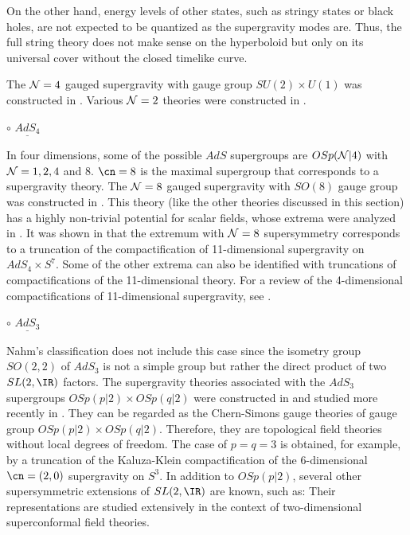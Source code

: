On the other hand, energy levels of other states, such as stringy
states or black holes, are not expected to be quantized as 
the supergravity modes are. Thus, the full string theory does not make
sense on the hyperboloid but only on its universal cover
without the closed timelike curve.

The ${\cal N}=4$ gauged supergravity with gauge group $SU(2) \times
U(1)$ was constructed in
\cite{Romans:1986ps}. Various ${\cal N}=2$ theories were
constructed in \cite{D'Auria:1982yi,Gunaydin:1984bi,Gunaydin:1984nt,
Gunaydin:1985ak}. 


\medskip
\noindent
$\circ$ $\underline{AdS_4}$

In four dimensions, some of the possible $AdS$ supergroups are
$OSp({\cal N}|4)$ with ${\cal N}=1,2,4$ and $8$. $\cn=8$ is the
maximal supergroup that corresponds to a supergravity theory.
The ${\cal N}=8$ gauged supergravity with $SO(8)$
gauge group was constructed in \cite{deWit:1982eq,
deWit:1982ig}. This theory (like the other theories discussed in
this section) has a highly
non-trivial potential for scalar fields, whose extrema
were analyzed in \cite{Warner:1983vz,Warner:1984du}. It was
shown in \cite{deWit:1985iy}  that the extremum with
${\cal N}=8$ supersymmetry corresponds to a truncation of the
compactification of  11-dimensional supergravity
on $AdS_4\times S^7$. Some of the other extrema can also be
identified with truncations of
compactifications of the 11-dimensional theory. 
For a review of the 4-dimensional compactifications
of 11-dimensional supergravity, see
\cite{Duff:1986hr}. 


\medskip
\noindent
$\circ$ $\underline{AdS_3}$

Nahm's classification does not include this case since
the isometry group $SO(2,2)$ of $AdS_3$ is not a simple group
but rather the direct product of two $SL(2,\IR)$ factors.
The supergravity theories associated with  the $AdS_3$
supergroups $OSp(p|2) \times OSp(q|2)$
were constructed in \cite{Achucarro:1989gm}
and studied more recently in \cite{Nishimura:1998ud}. They
can be regarded as the Chern-Simons gauge theories of gauge group
$OSp(p|2) \times OSp(q|2)$. Therefore, they are topological
field theories without local degrees of freedom. The case
of $p=q=3$ is obtained, for example, by a truncation of
the Kaluza-Klein
compactification of the 6-dimensional $\cn=(2,0)$ supergravity
on $S^3$. In addition to $OSp(p|2)$, several other
supersymmetric extensions of $SL(2,\IR)$ are known, such as:
%
Their representations are studied extensively in the context
of two-dimensional superconformal field theories. 



